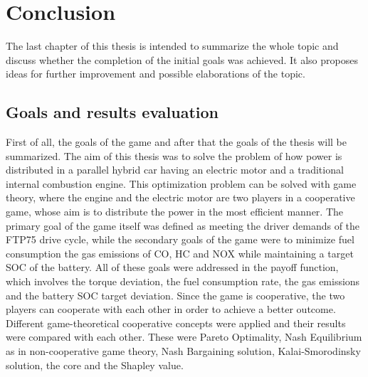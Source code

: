 \chapter{Conclusion}
\label{chp:conclusion}

The last chapter of this thesis is intended to summarize the whole topic and discuss whether the completion of the initial goals was achieved. It also proposes ideas for further improvement and possible elaborations of the topic.

\section{Goals and results evaluation}
First of all, the goals of the game and after that the goals of the thesis will be summarized. The aim of this thesis was to solve the problem of how power is distributed in a parallel hybrid car having an electric motor and a traditional internal combustion engine. This optimization problem can be solved with game theory, where the engine and the electric motor are two players in a cooperative game, whose aim is to distribute the power in the most efficient manner. The primary goal of the game itself was defined as meeting the driver demands of the FTP75 drive cycle, while the secondary goals of the game were to minimize fuel consumption the gas emissions of CO, HC and NOX while maintaining a target SOC of the battery. All of these goals were addressed in the payoff function, which involves the torque deviation, the fuel consumption rate, the gas emissions and the battery SOC target deviation. Since the game is cooperative, the two players can cooperate with each other in order to achieve a better outcome. Different game-theoretical cooperative concepts were applied and their results were compared with each other. These were Pareto Optimality, Nash Equilibrium as in non-cooperative game theory, Nash Bargaining solution, Kalai-Smorodinsky solution, the core and the Shapley value. 

